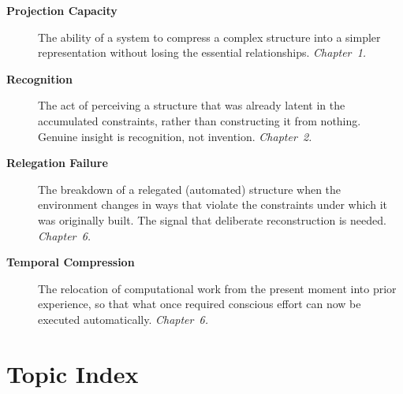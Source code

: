 \documentclass[11pt]{book}
\theoremstyle{definition}
\theoremstyle{remark}
\begin{document}
\begin{description}
\item[\textbf{Projection Capacity}] The ability of a system to compress
a complex structure into a simpler representation without losing the
essential relationships. \textit{Chapter~1.}

\item[\textbf{Recognition}] The act of perceiving a structure that was
already latent in the accumulated constraints, rather than constructing
it from nothing. Genuine insight is recognition, not invention.
\textit{Chapter~2.}

\item[\textbf{Relegation Failure}] The breakdown of a relegated
(automated) structure when the environment changes in ways that violate
the constraints under which it was originally built. The signal that
deliberate reconstruction is needed. \textit{Chapter~6.}

\item[\textbf{Temporal Compression}] The relocation of computational
work from the present moment into prior experience, so that what once
required conscious effort can now be executed automatically.
\textit{Chapter~6.}

\end{description}

\chapter*{Topic Index}

{\small\printindex}
\end{document}
